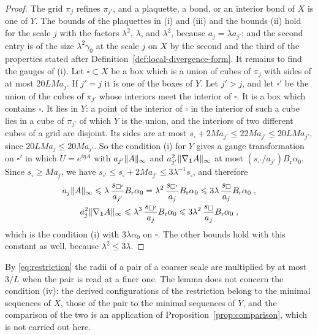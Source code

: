 \documentclass[11pt]{preprint}
\newcommand{\id}{\mathbf 1}
\DeclarePairedDelimiter{\norm}{\lVert}{\rVert}
\numberwithin{equation}{section}
\begin{document}
\begin{proof}
The grid $\pi_j$ refines $\pi_{j'}$, and a plaquette, a bond, or an interior bond of $X$ is one of $Y$. The bounds of the plaquettes in (i) and (iii) and the bounds (ii) hold for the scale $j$ with the factors $\lambda^2$, $\lambda$, and $\lambda^2$, because $a_j = \lambda a_{j'}$; and the second entry is of the size $\lambda^2\gamma_0$ at the scale $j$ on $X$ by the second and the third of the properties stated after Definition~\ref{def:local-divergence-form}. It remains to find the gauges of (i). Let $\square \subset X$ be a box which is a union of cubes of $\pi_j$ with sides of at most $20LMa_j$. If $j' = j$ it is one of the boxes of $Y$. Let $j' > j$, and let $\square'$ be the union of the cubes of $\pi_{j'}$ whose interiors meet the interior of $\square$. It is a box which contains $\square$. It lies in $Y$: a point of the interior of $\square$ in the interior of such a cube lies in a cube of $\pi_{j'}$ of which $Y$ is the union, and the interiors of two different cubes of a grid are disjoint. Its sides are at most $s_\square + 2Ma_{j'} \leqslant 22Ma_{j'} \leqslant 20LMa_{j'}$, since $20LMa_j \leqslant 20Ma_{j'}$. So the condition (i) for $Y$ gives a gauge transformation on $\square'$ in which $U = e^{i\eta A}$ with $a_{j'}\norm A_\infty$ and $a_{j'}^2\norm{\nabla_{\id}A}_\infty$ at most $(s_{\square'}/a_{j'})B_{\mathrm r}\alpha_0$. Since $s_\square \geqslant Ma_j$, we have $s_{\square'} \leqslant s_\square + 2Ma_{j'} \leqslant 3\lambda^{-1}s_\square$, and therefore
\begin{gather*}
    a_j\norm A_\infty \leqslant \lambda\,\frac{s_{\square'}}{a_{j'}}B_{\mathrm r}\alpha_0 = \lambda^2\,\frac{s_{\square'}}{a_j}B_{\mathrm r}\alpha_0 \leqslant 3\lambda\,\frac{s_\square}{a_j}B_{\mathrm r}\alpha_0\;,\\
    a_j^2\norm{\nabla_{\id}A}_\infty \leqslant \lambda^3\,\frac{s_{\square'}}{a_j}B_{\mathrm r}\alpha_0 \leqslant 3\lambda^2\,\frac{s_\square}{a_j}B_{\mathrm r}\alpha_0\;,
\end{gather*}
which is the condition (i) with $3\lambda\alpha_0$ on $\square$. The other bounds hold with this constant as well, because $\lambda^2 \leqslant 3\lambda$.
\end{proof}

By \eqref{eq:restriction} the radii of a pair of a coarser scale are multiplied by at most $3/L$ when the pair is read at a finer one. The lemma does not concern the condition (iv): the derived configurations of the restriction belong to the minimal sequences of $X$, those of the pair to the minimal sequences of $Y$, and the comparison of the two is an application of Proposition~\ref{prop:comparison}, which is not carried out here.
\end{document}
